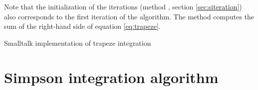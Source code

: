 Note that the initialization of the iterations (method , \cf section \ref{sec:siteration}) also corresponds to the first iteration of the algorithm.
The method  computes the sum of the right-hand side of equation \ref{eq:trapeze}.

\begin{listing} Smalltalk implementation of trapeze integration
\label{ls:trapeze}

\end{listing}


\section{Simpson integration algorithm}


